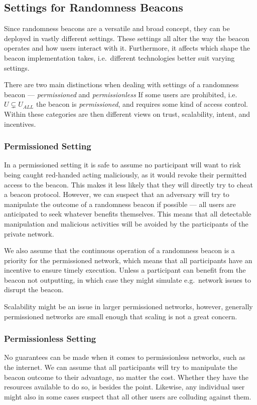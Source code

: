\subsection{Settings for Randomness Beacons}
Since randomness beacons are a versatile and broad concept, they can be deployed in vastly different settings.
These settings all alter the way the beacon operates and how users interact with it.
Furthermore, it affects which shape the beacon implementation takes, i.e.\ different technologies better suit varying settings.

There are two main distinctions when dealing with settings of a randomness beacon --- \emph{permissioned} and \emph{permissionless} If some users are prohibited, i.e.\ $U \subsetneq U_{ALL}$ the beacon is \emph{permissioned}, and requires some kind of access control.
Within these categories are then different views on trust, scalability, intent, and incentives.

\subsubsection{Permissioned Setting}
In a permissioned setting it is safe to assume no participant will want to risk being caught red-handed acting maliciously, as it would revoke their permitted access to the beacon. This makes it less likely that they will directly try to cheat a beacon protocol.
However, we can suspect that an adversary will try to manipulate the outcome of a randomness beacon if possible --- all users are anticipated to seek whatever benefits themselves.
This means that all detectable manipulation and malicious activities will be avoided by the participants of the private network.

We also assume that the continuous operation of a randomness beacon is a priority for the permissioned network, which means that all participants have an incentive to ensure timely execution.
Unless a participant can benefit from the beacon not outputting, in which case they might simulate e.g.\ network issues to disrupt the beacon.

Scalability might be an issue in larger permissioned networks, however, generally permissioned networks are small enough that scaling is not a great concern.

\subsubsection{Permissionless Setting}
No guarantees can be made when it comes to permissionless networks, such as the internet.
We can assume that all participants will try to manipulate the beacon outcome to their advantage, no matter the cost.
Whether they have the resources available to do so, is besides the point.
Likewise, any individual user might also in some cases suspect that all other users are colluding against them.

